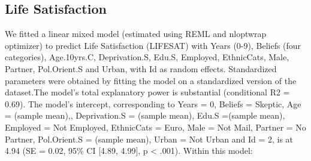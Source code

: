 \documentclass[
  english,
  man]{apa6}
\begin{document}
\hypertarget{life-satisfaction}{%
\subsection{Life Satisfaction}\label{life-satisfaction}}

We fitted a linear mixed model (estimated using REML and nloptwrap optimizer) to predict Life Satisfaction (LIFESAT) with Years (0-9), Beliefs (four categories), Age.10yrs.C, Deprivation.S, Edu.S, Employed, EthnicCats, Male, Partner, Pol.Orient.S and Urban, with Id as random effects. Standardized parameters were obtained by fitting the model on a standardized version of the dataset.The model's total explanatory power is substantial (conditional R2 = 0.69). The model's intercept, corresponding to Years = 0, Beliefs = Skeptic, Age = (sample mean),, Deprivation.S = (sample mean), Edu.S =(sample mean), Employed = Not Employed, EthnicCats = Euro, Male = Not Mail, Partner = No Partner, Pol.Orient.S = (sample mean), Urban = Not Urban and Id = 2, is at 4.94 (SE = 0.02, 95\% CI {[}4.89, 4.99{]}, p \textless{} .001). Within this model:
\end{document}
